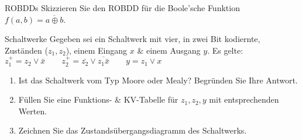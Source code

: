 \documentclass{article}
\begin{document}
\begin{exercise}{ROBDDs}
  Skizzieren Sie den ROBDD für die Boole'sche Funktion $f(a, b) = \overline{a \oplus b}$.

  \begin{solution}
  \end{solution}
\end{exercise}

\begin{exercise}{Schaltwerke}
  Gegeben sei ein Schaltwerk mit vier, in zwei Bit kodiernte, Zuständen ($z_1, z_2$), einem Eingang $x$ \& einem Ausgang $y$. Es gelte:
  \centering$z_1^+ = z_2 \lor \bar{x}\qquad z_2^+ = \bar{z_2} \lor \overline{z_1\bar{x}}\qquad y = z_1 \lor x$
  \begin{enumerate}
    \item Ist das Schaltwerk vom Typ Moore oder Mealy? Begründen Sie Ihre Antwort.
    \item Füllen Sie eine Funktions- \& KV-Tabelle für $z_1, z_2, y$ mit entsprechenden Werten.
    \item Zeichnen Sie das Zustandsübergangsdiagramm des Schaltwerks.
  \end{enumerate}
\end{exercise}
\end{document}
